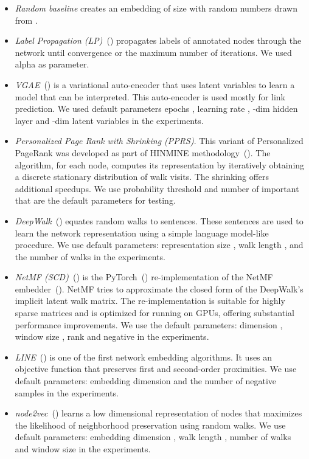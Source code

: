 \documentclass[twoside,11pt]{article}
\begin{document}
\begin{itemize}
\item \emph{Random baseline} creates an embedding of size  with random numbers drawn from .
\item \emph{Label Propagation (LP)}~(\cite{zhu2002learning}) propagates labels of annotated nodes through the network until convergence or the maximum number of iterations. We used alpha  as parameter.
\item \emph{VGAE}~(\cite{kipf2016variational}) is a variational auto-encoder that uses latent variables to learn a model that can be interpreted. This auto-encoder is used mostly for link prediction. We used default parameters epochs , learning rate , -dim hidden layer and -dim latent variables in the experiments.
\item \emph{Personalized Page Rank with Shrinking (PPRS)}. This variant of Personalized PageRank was developed as part of HINMINE methodology~(\cite{kralj2017hinmine}). The algorithm, for each node, computes its representation by iteratively obtaining a discrete stationary distribution of walk visits. The shrinking offers additional speedups. We use probability threshold  and number of important  that are the default parameters for testing.
\item \emph{DeepWalk}~(\cite{Perozzi2014deepwalk}) equates random walks to sentences. These sentences are used to learn the network representation using a simple language model-like procedure. We use default parameters: representation size , walk length , and the number of walks  in the experiments.
\item \emph{NetMF (SCD)}~(\cite{skrlj2019embeddingbased}) is the PyTorch~(\cite{paszke2017automatic}) re-implementation of the NetMF embedder~(\cite{qiu2018network}). NetMF tries to approximate the closed form of the DeepWalk's implicit latent walk matrix. The re-implementation is suitable for highly sparse matrices and is optimized for running on GPUs, offering substantial performance improvements. We use the default parameters: dimension , window size , rank  and negative  in the experiments.
\item \emph{LINE}~(\cite{tang2015line}) is one of the first network embedding algorithms. It uses an objective function that preserves first and second-order proximities. We use default parameters: embedding dimension  and the number of negative samples  in the experiments.
\item \emph{node2vec}~(\cite{grover2016node2vec}) learns a low dimensional representation of nodes that maximizes the likelihood of neighborhood preservation using random walks. We use default parameters: embedding dimension , walk length , number of walks  and window size  in the experiments.
\end{itemize}
\end{document}
